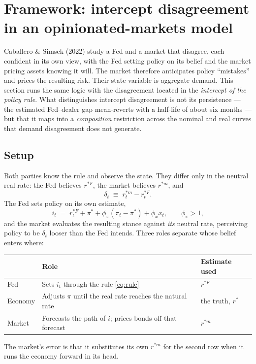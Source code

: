 \documentclass[11pt]{article}
\begin{document}
\section{Framework: intercept disagreement in an opinionated-markets model}
\label{sec:framework}
Caballero \& Simsek (2022) study a Fed and a market that disagree, each confident in its own
view, with the Fed setting policy on its belief and the market pricing assets knowing it will.
The market therefore anticipates policy ``mistakes'' and prices the resulting risk. Their state
variable is aggregate demand. This section runs the same logic with the disagreement located in
the \emph{intercept of the policy rule}. What distinguishes intercept disagreement is not its
persistence --- the estimated Fed--dealer gap mean-reverts with a half-life of about six months
--- but that it maps into a \emph{composition} restriction across the nominal and real curves
that demand disagreement does not generate.
\subsection{Setup}
Both parties know the rule and observe the state. They differ only in the neutral real rate:
the Fed believes $r^{*F}$, the market believes $r^{*m}$, and
\begin{equation}
\delta_t \;\equiv\; r^{*m}_t - r^{*F}_t .
\label{eq:delta}
\end{equation}
The Fed sets policy on its own estimate,
\begin{equation}
i_t \;=\; r^{*F}_t + \pi^{*} + \phi_\pi\!\left(\pi_t - \pi^{*}\right) + \phi_x x_t ,
\qquad \phi_\pi > 1 ,
\label{eq:rule}
\end{equation}
and the market evaluates the resulting stance against \emph{its} neutral rate, perceiving policy
to be $\delta_t$ looser than the Fed intends. Three roles separate whose belief enters where:
\begin{center}\small
\begin{tabular}{@{}lll@{}}
\toprule
& \textbf{Role} & \textbf{Estimate used}\\ \midrule
Fed & Sets $i_t$ through the rule \eqref{eq:rule} & $r^{*F}$\\
Economy & Adjusts $\pi$ until the real rate reaches the natural rate & the truth, $r^{*}$\\
Market & Forecasts the path of $i$; prices bonds off that forecast & $r^{*m}$\\
\bottomrule\end{tabular}
\end{center}
\noindent The market's error is that it substitutes its own $r^{*m}$ for the second row when it
runs the economy forward in its head.
\end{document}
